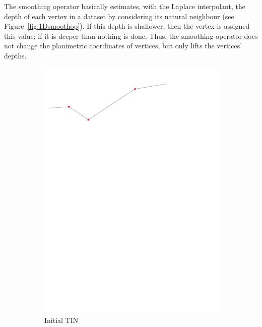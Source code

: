 The smoothing operator basically estimates, with the Laplace interpolant, the depth of each vertex in a dataset by considering its natural neighbour (see Figure~\ref{fig:1Dsmoothop}).
If this depth is shallower, then the vertex is assigned this value; if it is deeper than nothing is done.
Thus, the smoothing operator does not change the planimetric coordinates of vertices, but only lifts the vertices' depths. 
\begin{figure}[tbh]
  \centering
  \begin{subfigure}[b]{0.45\linewidth}
    \centering
    \includegraphics[width=\textwidth,page=1]{figs/1Dsmoothop.pdf}
    \caption{Initial TIN}\label{fig:1Dsmoothop:a}
  \end{subfigure}
  \quad
  \begin{subfigure}[b]{0.45\linewidth}
    \centering

\end{subfigure}
\end{figure}
